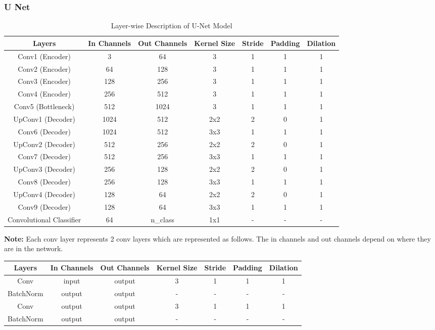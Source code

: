 \documentclass{article}
\begin{document}
\subsubsection{U Net}
\begin{table}[h]
\centering
\begin{tabular}{|c|c|c|c|c|c|c|}
\hline
\multicolumn{1}{|c|}{\textbf{Layers}} & \textbf{In Channels} & \textbf{Out Channels} & \textbf{Kernel Size} & \textbf{Stride} & \textbf{Padding} & \textbf{Dilation} \\
\hline
Conv1 (Encoder) & 3 & 64 & 3 & 1 & 1 & 1 \\
Conv2 (Encoder) & 64 & 128 & 3 & 1 & 1 & 1 \\
Conv3 (Encoder) & 128 & 256 & 3 & 1 & 1 & 1 \\
Conv4 (Encoder) & 256 & 512 & 3 & 1 & 1 & 1 \\
Conv5 (Bottleneck) & 512 & 1024 & 3 & 1 & 1 & 1 \\
UpConv1 (Decoder) & 1024 & 512 & 2x2 & 2 & 0 & 1 \\
Conv6 (Decoder) & 1024 & 512 & 3x3 & 1 & 1 & 1 \\
UpConv2 (Decoder) & 512 & 256 & 2x2 & 2 & 0 & 1 \\
Conv7 (Decoder) & 512 & 256 & 3x3 & 1 & 1 & 1 \\
UpConv3 (Decoder) & 256 & 128 & 2x2 & 2 & 0 & 1 \\
Conv8 (Decoder) & 256 & 128 & 3x3 & 1 & 1 & 1 \\
UpConv4 (Decoder) & 128 & 64 & 2x2 & 2 & 0 & 1 \\
Conv9 (Decoder) & 128 & 64 & 3x3 & 1 & 1 & 1 \\
Convolutional Classifier & 64 & n\_class & 1x1 & - & - & - \\
\hline
\end{tabular}
\caption{Layer-wise Description of U-Net Model}
\label{tab:network_layers}
\end{table}
\textbf{Note:} Each conv layer represents 2 conv layers which are represented as follows. The in channels and out channels depend on where they are in the network.

\begin{table}[H]
\begin{tabular}{|c|c|c|c|c|c|c|}
\hline
\multicolumn{1}{|c|}{\textbf{Layers}} & \textbf{In Channels} & \textbf{Out Channels} & \textbf{Kernel Size} & \textbf{Stride} & \textbf{Padding} & \textbf{Dilation} \\
\hline
Conv & input & output & 3 & 1 & 1 & 1 \\
BatchNorm  & output & output & - & - & - & - \\
Conv & output & output & 3 & 1 & 1 & 1 \\
BatchNorm  & output & output & - & - & - & - \\

\hline
\end{tabular}
\end{table}
\end{document}
